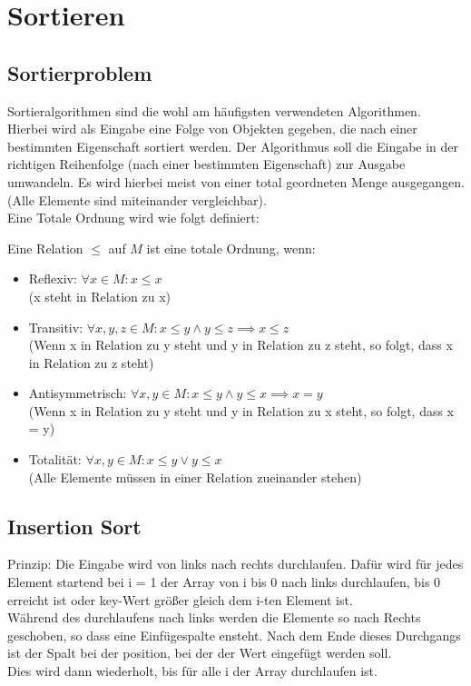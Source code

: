 \documentclass[
../../AuD-Zusammenfassung.tex,
]
{subfiles}
\begin{document}
\section{Sortieren}
\subsection{Sortierproblem}
Sortieralgorithmen sind die wohl am häufigsten verwendeten Algorithmen. Hierbei wird als Eingabe eine Folge von Objekten gegeben, die nach einer bestimmten Eigenschaft sortiert werden. Der Algorithmus soll die Eingabe in der richtigen Reihenfolge (nach einer bestimmten Eigenschaft) zur Ausgabe umwandeln. Es wird hierbei meist von einer total geordneten Menge ausgegangen. (Alle Elemente sind miteinander vergleichbar). \\
Eine Totale Ordnung wird wie folgt definiert:
\begin{center}
    Eine Relation $\leq$ auf $M$ ist eine totale Ordnung, wenn:
    \begin{itemize}
        \item Reflexiv: $\forall x \in M: x \leq x$ \\
        (x steht in Relation zu x)
        \item Transitiv: $\forall x,y,z \in M: x \leq y \wedge y \leq z \implies x \leq z$ \\
        (Wenn x in Relation zu y steht und y in Relation zu z steht, so folgt, dass x in Relation zu z steht)
        \item Antisymmetrisch: $\forall x,y \in M: x \leq y \wedge y \leq x \implies x = y$ \\
        (Wenn x in Relation zu y steht und y in Relation zu x steht, so folgt, dass x = y)
        \item Totalität: $\forall x,y \in M: x \leq y \vee y \leq x$ \\
        (Alle Elemente müssen in einer Relation zueinander stehen)
    \end{itemize}
\end{center}
\newpage
\subsection{Insertion Sort}


Prinzip: Die Eingabe wird von links nach rechts durchlaufen. Dafür wird für jedes Element startend bei i = 1 der Array von i bis 0 nach links durchlaufen, bis 0 erreicht ist oder key-Wert größer gleich dem i-ten Element ist. \\ 
Während des durchlaufens nach links werden die Elemente so nach Rechts geschoben, so dass eine Einfügespalte ensteht. Nach dem Ende dieses Durchgangs ist der Spalt bei der position, bei der der Wert eingefügt werden soll. \\
Dies wird dann wiederholt, bis für alle i der Array durchlaufen ist.
\end{document}

